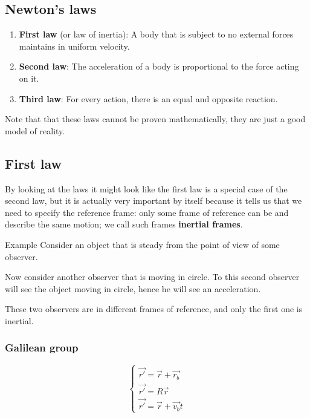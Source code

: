 \documentclass[14pt]{extarticle}
\begin{document}
\subsection{Newton's laws}

\begin{enumerate}
  \item \textbf{First law} (or law of inertia): A body that is subject to no external forces maintains in uniform velocity.
  \item \textbf{Second law}: The acceleration of a body is proportional to the force acting on it.
  \item \textbf{Third law}: For every action, there is an equal and opposite reaction.
\end{enumerate}

Note that that these laws cannot be proven mathematically, they are just a good model of reality.

\subsection{First law}

By looking at the laws it might look like the first law is a special case of the second law,
but it is actually very important by itself because it tells us that we need to specify the reference frame:
only some frame of reference can be  and describe the same motion; we call such frames \textbf{inertial frames}.

\begin{examplebox}{Example}
  Consider an object that is steady from the point of view of some observer.

  Now consider another observer that is moving in circle.
  To this second observer will see the object moving in circle, hence he will see an acceleration.

  These two observers are in different frames of reference, and only the first one is inertial.
\end{examplebox}

\subsubsection{Galilean group}

$$
  \begin{cases}
    \vec {r'} = \vec r + \vec{r_b} \\
    \vec {r'} = R \vec r           \\
    \vec {r'} = \vec r + \vec{v_b} t
  \end{cases}
$$
\end{document}
